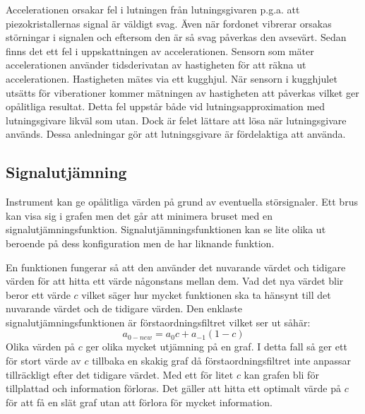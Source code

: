 Accelerationen orsakar fel i lutningen från lutningsgivaren p.g.a. att
piezokristallernas signal är väldigt svag.
Även när fordonet vibrerar orsakas störningar i signalen och eftersom den är så svag
påverkas den avsevärt.
Sedan finns det ett fel i uppskattningen av accelerationen.
Sensorn som mäter accelerationen använder tidsderivatan av hastigheten för
att räkna ut accelerationen.
Hastigheten mätes via ett kugghjul.
När sensorn i kugghjulet utsätts för viberationer kommer mätningen av
hastigheten att påverkas vilket ger opålitliga resultat.
Detta fel uppstår både vid lutningsapproximation med lutningsgivare likväl som utan.
Dock är felet lättare att lösa när lutningsgivare används.
Dessa anledningar gör att lutningsgivare är fördelaktiga att använda.
\autocite{lauri17}

\subsection{Signalutjämning}
Instrument kan ge opålitliga värden på grund av eventuella störsignaler.
Ett brus kan visa sig i grafen men det går att minimera bruset med en signalutjämningsfunktion.
Signalutjämningsfunktionen kan se lite olika ut beroende på dess konfiguration
men de har liknande funktion.

En funktionen fungerar så att den använder det nuvarande värdet och
tidigare värden för att hitta ett värde någonstans mellan dem. Vad det
nya värdet blir beror ett värde $c$ vilket säger hur mycket funktionen ska
ta hänsynt till det nuvarande värdet och de tidigare värden. Den enklaste
signalutjämningsfunktionen är förstaordningsfiltret vilket ser ut såhär:
\begin{equation}
	a_{0-new} = a_{0}c + a_{-1}(1 - c)
\end{equation}
Olika värden på $c$ ger olika mycket utjämning på en graf.
I detta fall så ger ett för stort värde av $c$ tillbaka en skakig graf
då förstaordningsfiltret inte anpassar tillräckligt efter det tidigare värdet.
Med ett för litet $c$ kan grafen bli för tillplattad och information förloras.
Det gäller att hitta ett optimalt värde på $c$ för att få en slät graf
utan att förlora för mycket information.


